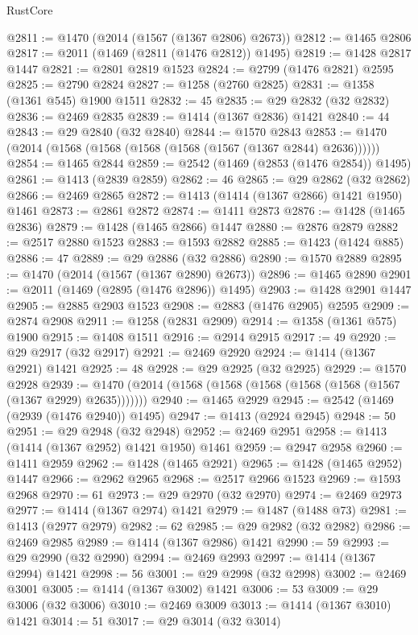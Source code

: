 \begin{lexlean}{RustCore}
\begin{coremodule}
{\begin{coremodule}
{{{{{{{{{{{{{{{{{{{{{{{{{{{{{{{{{{{{{{{{{{{{{{{@2811 := @1470 (@2014 (@1567 (@1367 @2806) @2673))
@2812 := @1465 @2806
@2817 := @2011 (@1469 (@2811 (@1476 @2812)) @1495)
@2819 := @1428 @2817 @1447
@2821 := @2801 @2819 @1523
@2824 := @2799 (@1476 @2821) @2595
@2825 := @2790 @2824
@2827 := @1258 (@2760 @2825)
@2831 := @1358 (@1361 @545) @1900 @1511
@2832 := 45
@2835 := @29 @2832 (@32 @2832)
@2836 := @2469 @2835
@2839 := @1414 (@1367 @2836) @1421
@2840 := 44
@2843 := @29 @2840 (@32 @2840)
@2844 := @1570 @2843
@2853 := @1470 (@2014 (@1568 (@1568 (@1568 (@1568 (@1567 (@1367 @2844) @2636))))))
@2854 := @1465 @2844
@2859 := @2542 (@1469 (@2853 (@1476 @2854)) @1495)
@2861 := @1413 (@2839 @2859)
@2862 := 46
@2865 := @29 @2862 (@32 @2862)
@2866 := @2469 @2865
@2872 := @1413 (@1414 (@1367 @2866) @1421 @1950) @1461
@2873 := @2861 @2872
@2874 := @1411 @2873
@2876 := @1428 (@1465 @2836)
@2879 := @1428 (@1465 @2866) @1447
@2880 := @2876 @2879
@2882 := @2517 @2880 @1523
@2883 := @1593 @2882
@2885 := @1423 (@1424 @885)
@2886 := 47
@2889 := @29 @2886 (@32 @2886)
@2890 := @1570 @2889
@2895 := @1470 (@2014 (@1567 (@1367 @2890) @2673))
@2896 := @1465 @2890
@2901 := @2011 (@1469 (@2895 (@1476 @2896)) @1495)
@2903 := @1428 @2901 @1447
@2905 := @2885 @2903 @1523
@2908 := @2883 (@1476 @2905) @2595
@2909 := @2874 @2908
@2911 := @1258 (@2831 @2909)
@2914 := @1358 (@1361 @575) @1900
@2915 := @1408 @1511
@2916 := @2914 @2915
@2917 := 49
@2920 := @29 @2917 (@32 @2917)
@2921 := @2469 @2920
@2924 := @1414 (@1367 @2921) @1421
@2925 := 48
@2928 := @29 @2925 (@32 @2925)
@2929 := @1570 @2928
@2939 := @1470 (@2014 (@1568 (@1568 (@1568 (@1568 (@1568 (@1567 (@1367 @2929) @2635)))))))
@2940 := @1465 @2929
@2945 := @2542 (@1469 (@2939 (@1476 @2940)) @1495)
@2947 := @1413 (@2924 @2945)
@2948 := 50
@2951 := @29 @2948 (@32 @2948)
@2952 := @2469 @2951
@2958 := @1413 (@1414 (@1367 @2952) @1421 @1950) @1461
@2959 := @2947 @2958
@2960 := @1411 @2959
@2962 := @1428 (@1465 @2921)
@2965 := @1428 (@1465 @2952) @1447
@2966 := @2962 @2965
@2968 := @2517 @2966 @1523
@2969 := @1593 @2968
@2970 := 61
@2973 := @29 @2970 (@32 @2970)
@2974 := @2469 @2973
@2977 := @1414 (@1367 @2974) @1421
@2979 := @1487 (@1488 @73)
@2981 := @1413 (@2977 @2979)
@2982 := 62
@2985 := @29 @2982 (@32 @2982)
@2986 := @2469 @2985
@2989 := @1414 (@1367 @2986) @1421
@2990 := 59
@2993 := @29 @2990 (@32 @2990)
@2994 := @2469 @2993
@2997 := @1414 (@1367 @2994) @1421
@2998 := 56
@3001 := @29 @2998 (@32 @2998)
@3002 := @2469 @3001
@3005 := @1414 (@1367 @3002) @1421
@3006 := 53
@3009 := @29 @3006 (@32 @3006)
@3010 := @2469 @3009
@3013 := @1414 (@1367 @3010) @1421
@3014 := 51
@3017 := @29 @3014 (@32 @3014)
}}}}}}}}}}}}}}}}}}}}}}}}}}}}}}}}}}}}}}}}}}}}}}}
\end{coremodule}}
\end{coremodule}
\end{lexlean}
